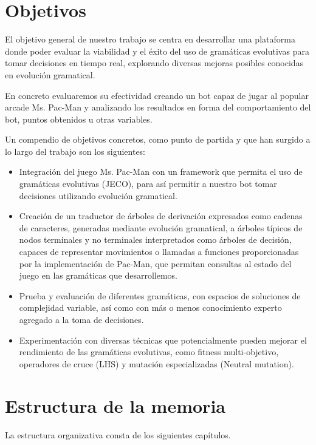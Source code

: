 \section{Objetivos}
El objetivo general de nuestro trabajo se centra en desarrollar una plataforma donde poder evaluar la viabilidad y el éxito del uso de gramáticas evolutivas para tomar decisiones en tiempo real, explorando diversas mejoras posibles conocidas en evolución gramatical. 

En concreto evaluaremos su efectividad creando un bot capaz de jugar al popular arcade Ms. Pac-Man y analizando los resultados en forma del comportamiento del bot, puntos obtenidos u otras variables.
 
Un compendio de objetivos concretos, como punto de partida y que han surgido a lo largo del trabajo son los siguientes:
\begin{itemize}
\item Integración del juego Ms. Pac-Man con un framework que permita el uso de gramáticas evolutivas (JECO), para así permitir a nuestro bot tomar decisiones utilizando evolución gramatical.

\item Creación de un traductor de árboles de derivación expresados como cadenas de caracteres, generadas mediante evolución gramatical, a árboles típicos de nodos terminales y no terminales interpretados como árboles de decisión, capaces de representar movimientos o llamadas a funciones proporcionadas por la implementación de Pac-Man, que permitan consultas al estado del juego en las gramáticas que desarrollemos.

\item Prueba y evaluación de diferentes gramáticas, con espacios de soluciones de complejidad variable, así como con más o menos conocimiento experto agregado a la toma de decisiones.

\item Experimentación con diversas técnicas que potencialmente pueden mejorar el rendimiento de las gramáticas evolutivas, como fitness multi-objetivo, operadores de cruce (LHS) y mutación especializadas (Neutral mutation).
\end{itemize}

\section{Estructura de la memoria}
La estructura organizativa consta de los siguientes capítulos.

